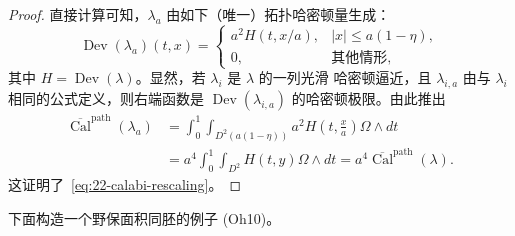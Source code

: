 \begin{proof}
直接计算可知，$\lambda_a$ 由如下（唯一）拓扑哈密顿量生成：
\[
 \operatorname{Dev}(\lambda_a)(t,x)=
 \begin{cases}
  a^2H(t,x/a),&|x|\leq a(1-\eta),\\
  0,&\text{其他情形},
 \end{cases}
\]
其中 $H=\operatorname{Dev}(\lambda)$。显然，若 $\lambda_i$ 是 $\lambda$ 的一列光滑
哈密顿逼近，且 $\lambda_{i,a}$ 由与 $\lambda_i$ 相同的公式定义，则右端函数是
$\operatorname{Dev}(\lambda_{i,a})$ 的哈密顿极限。由此推出
\begin{align*}
 \overline{\operatorname{Cal}}^{\mathrm{path}}(\lambda_a)
 &=\int_0^1\int_{D^2(a(1-\eta))}a^2H\!\left(t,\frac xa\right)
   \Omega\wedge dt\\
 &=a^4\int_0^1\int_{D^2}H(t,y)\Omega\wedge dt
 =a^4\overline{\operatorname{Cal}}^{\mathrm{path}}(\lambda).
\end{align*}
这证明了~\eqref{eq:22-calabi-rescaling}。
\end{proof}

下面构造一个野保面积同胚的例子 (Oh10)。

